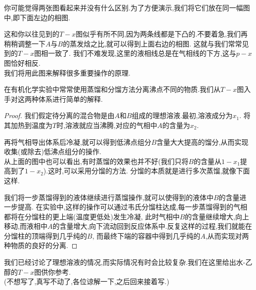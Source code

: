 \documentclass{ctexart}
\begin{document}
\begin{derivation}
    \begin{center}
        
    \end{center}
    你可能觉得两张图看起来并没有什么区别.为了方便演示,我们将它们放在同一幅图中,即下面左边的相图.
    \begin{center}
        
    \end{center}
    这和你以往见到的$T-x$图似乎有所不同,因为两条线都是下凸的.不要着急,我们再稍稍调整一下$A$与$B$的蒸发焓之比,就可以得到上面右边的相图.%
    这就与我们常常见到的$T-x$图相一致了\footnotemark.%
    我们不难发现,这里的液相线总是在气相线的下方,这与$p-x$图恰好相反.\\
    我们将用此图来解释很多重要操作的原理.
\end{derivation}
\indent 在有机化学实验中常常使用蒸馏和分馏方法分离沸点不同的物质.我们从$T-x$图入手对这两种体系进行简单的解释.
\begin{proof}
    我们假定待分离的混合物是由$A$和$B$组成的理想溶液.最初,溶液成分为$x_1$.%
    将其加热到温度为$T$时,溶液就应当沸腾,对应的气相中$A$的含量为$x_2$.
    \begin{center}
        
    \end{center}
    再将气相导出体系后冷凝,就可以得到低沸点组分$B$含量大大提高的馏分,从而实现收集(或除去)低沸点组分的操作.\\
    从上面的图中也可以看出,有时蒸馏的效果也并不好(我们只将$B$的含量从$1-x_1$提高到了$1-x_2$).这时,可以采用分馏的方法.%
    分馏的本质就是进行多次蒸馏,就像下面这样.
    \begin{center}
        
    \end{center}
    我们将一步蒸馏得到的液体继续进行蒸馏操作,就可以使得到的液体中$B$的含量进一步提高.%
    在实验中,这样的操作可以通过韦氏分馏柱达成,每一步蒸馏得到的气相都将在分馏柱的更上端(温度更低处)发生冷凝,%
    此时气相中$B$的含量继续增大,向上移动,而液相中$A$的含量增大,向下流动回到反应体系中.反复这样的过程,我们就能在分馏柱的顶端得到几乎纯的$B$,%
    而最终下端的容器中得到几乎纯的$A$,从而实现对两种物质的良好的分离.
\end{proof}
\indent 我们已经讨论了理想溶液的情况,而实际情况有时会比较复杂.我们在这里给出水-乙醇的$T-x$图供你参考.\\
(不想写了,真写不动了,各位谅解一下,之后回来接着写.)
\end{document}
